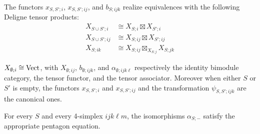 \documentclass{amsart}
\begin{document}
\begin{list}{(TCO)}{}
	\item  The functors $x_{S,S';i}$, $x_{S,S'; ij}$, and $b_{S;ijk}$ realize equivalences with the following Deligne tensor products:
	\begin{align*}
		X_{S \cup S'; i} &\cong X_{S; i} \boxtimes X_{S';i} \\ 
		X_{S \cup S'; ij} &\cong X_{S; ij} \boxtimes X_{S';ij} \\ 
		X_{S; ik} & \cong X_{S;ij} \boxtimes_{X_{S;j}} X_{S;jk}
	\end{align*}
	\item  $X_{\emptyset; i} \cong \mathrm{Vect}$, with $X_{\emptyset; ij}$, $b_{\emptyset; ijk}$, and $\alpha_{\emptyset; ijk\ell}$ respectively the identity bimodule category, the tensor functor, and the tensor associator.  Moreover when either $S$ or $S'$ is empty, the functors $x_{S,S'; i}$ and $x_{S, S'; ij}$ and the transformation $\psi_{S,S'; ijk}$ are the canonical ones.  
	\item  For every $S$ and every 4-simplex $ijk\ell m$, the isomorphisms $\alpha_{S; -}$ satisfy the appropriate pentagon equation.


\end{list}
\end{document}
